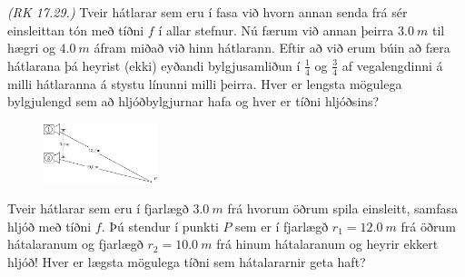 \ifdefined \wholebook \else\documentclass[oneside]{book}\usepackage{EdlBook}\graphicspath{{figures/}}
\begin{document}
\begin{enumerate}[label = \textbf{Dæmi \thechapter.\arabic*.}]
\setcounter{enumi}{35}

\item \textit{(RK 17.29.)} Tveir hátlarar sem eru í fasa við hvorn annan senda frá sér einsleittan tón með tíðni $f$ í allar stefnur. Nú færum við annan þeirra $\SI{3.0}{m}$ til hægri og $\SI{4.0}{m}$ áfram miðað við hinn hátlarann. Eftir að við erum búin að færa hátlarana þá heyrist (ekki) eyðandi bylgjusamliðun í $\frac{1}{4}$ og $\frac{3}{4}$ af vegalengdinni á milli hátlaranna á stystu línunni milli þeirra. Hver er lengsta mögulega bylgjulengd sem að hljóðbylgjurnar hafa og hver er tíðni hljóðsins?

\begin{minipage}{\linewidth}

\begin{figure}
\vspace{-0.75cm}
\includegraphics[width = 1.3in]{figures/dia-hatalar.pdf}
\end{figure}

\item Tveir hátlarar sem eru í fjarlægð $\SI{3.0}{m}$ frá hvorum öðrum spila einsleitt, samfasa hljóð með tíðni $f$. Þú stendur í punkti $P$ sem er í fjarlægð $r_1 = \SI{12.0}{m}$ frá öðrum hátalaranum og fjarlægð $r_2 = \SI{10.0}{m}$ frá hinum hátalaranum og heyrir ekkert hljóð! Hver er lægsta mögulega tíðni sem hátalararnir geta haft?


\end{minipage}
\end{enumerate}
\end{document}
